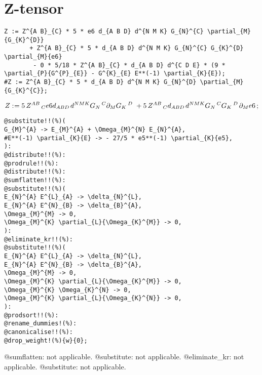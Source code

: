 \documentclass[11pt]{article}
\def\specialcolon{\mathrel{\mathop{:}}\hspace{-.5em}}
\begin{document}
\section*{Z-tensor}
{\color[named]{Blue}\begin{verbatim}
Z := Z^{A B}_{C} * 5 * e6 d_{A B D} d^{N M K} G_{N}^{C} \partial_{M}{G_{K}^{D}} 
       + Z^{A B}_{C} * 5 * d_{A B D} d^{N M K} G_{N}^{C} G_{K}^{D} \partial_{M}{e6} 
        - 0 * 5/18 * Z^{A B}_{C} * d_{A B D} d^{C D E} * (9 * \partial_{P}{G^{P}_{E}} - G^{K}_{E} E**(-1) \partial_{K}{E});
#Z := Z^{A B}_{C} * 5 * d_{A B D} d^{N M K} G_{N}^{D} \partial_{M}{G_{K}^{C}};
\end{verbatim}}
\begin{dmath*}[compact, spread=2pt]
Z\specialcolon{}= 5\, {Z}^{A B}\,_{C} e6 {d}_{A B D\, } {d}^{N M K} {G}_{N}\,^{C} {\partial}_{M}{{G}_{K}\,^{D\, }}\,  + 5\, {Z}^{A B}\,_{C} {d}_{A B D\, } {d}^{N M K} {G}_{N}\,^{C} {G}_{K}\,^{D\, } {\partial}_{M}{e6}\, ;
\end{dmath*}
{\color[named]{Blue}\begin{verbatim}
@substitute!!(%)(
G_{M}^{A} -> E_{M}^{A} + \Omega_{M}^{N} E_{N}^{A},
#E**(-1) \partial_{K}{E} -> - 27/5 * e5**(-1) \partial_{K}{e5},
):
@distribute!!(%):
@prodrule!!(%):
@distribute!!(%):
@sumflatten!!(%):
@substitute!!(%)(
E_{N}^{A} E^{L}_{A} -> \delta_{N}^{L},
E_{N}^{A} E^{N}_{B} -> \delta_{B}^{A},
\Omega_{M}^{M} -> 0,
\Omega_{M}^{K} \partial_{L}{\Omega_{K}^{M}} -> 0,
):
@eliminate_kr!!(%):
@substitute!!(%)(
E_{N}^{A} E^{L}_{A} -> \delta_{N}^{L},
E_{N}^{A} E^{N}_{B} -> \delta_{B}^{A},
\Omega_{M}^{M} -> 0,
\Omega_{M}^{K} \partial_{L}{\Omega_{K}^{M}} -> 0,
\Omega_{M}^{K} \Omega_{K}^{N} -> 0,
\Omega_{M}^{K} \partial_{L}{\Omega_{K}^{N}} -> 0,
):
@prodsort!!(%):
@rename_dummies!(%):
@canonicalise!!(%):
@drop_weight!(%){w}{0};
\end{verbatim}}
@sumflatten: not applicable.
@substitute: not applicable.
@eliminate\_kr: not applicable.
@substitute: not applicable.
\end{document}
